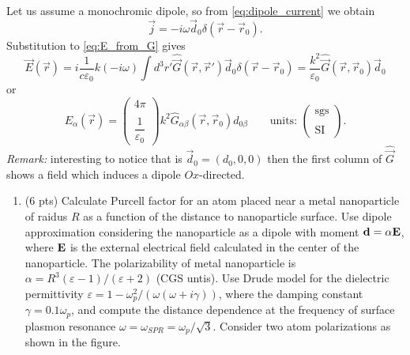\begin{testexample}
	Let us assume a monochromic dipole, so from \eqref{eq:dipole_current} we obtain
	\begin{equation}
		\vec{j} = -i\omega \vec{d}_0 \delta(\vec{r} - \vec{r}_0).
		\label{eq:dipole_curr}
	\end{equation}
	Substitution to \eqref{eq:E_from_G} gives
	\begin{equation}
		\vec{E}(\vec{r}) = i \frac{1}{c \varepsilon_0}k (-i\omega) \int d^3 r' \hat{\vec{G}}(\vec{r}, \vec{r}') \vec{d}_0 \delta(\vec{r} - \vec{r}_0) = \frac{k^2}{\varepsilon_0} \hat{\vec{G}}(\vec{r}, \vec{r}_0) \vec{d}_0
		\label{eq:dipole_field}
	\end{equation}
	or
	\begin{equation}
		E_{\alpha}(\vec{r}) = \begin{pmatrix}
		4\pi  \\ \\
		\dfrac{1}{\varepsilon_0}
		\end{pmatrix} k^2  \hat{G}_{\alpha \beta}(\vec{r}, \vec{r}_0) d_{0 \beta} \qquad \text{units: }\begin{pmatrix}
		\text{sgs}  \\ \\
		\text{SI}
		\end{pmatrix}.
	\end{equation}
	\textit{Remark:} interesting to notice that is $\vec{d}_0 = (d_0,0,0)$ then the first column of $\hat{\vec{G}}$ shows a field which induces a dipole $Ox$-directed.
\end{testexample}


\begin{hw}

\begin{enumerate}

\item (6 pts) Calculate Purcell factor for an atom placed near a metal nanoparticle of raidus $R$ as a function of the distance to nanoparticle surface. Use dipole approximation considering the nanoparticle as a dipole with moment ${\bf d}=\alpha {\bf E}$, where ${\bf E}$  is the external electrical field calculated in the center of the nanoparticle. The polarizability of metal nanoparticle is $\alpha=R^3(\varepsilon-1)/(\varepsilon+2)$ (CGS untis). Use Drude model for the dielectric permittivity $\varepsilon=1-\omega_p^2/(\omega(\omega+i\gamma))$, where the damping constant  $\gamma=0.1\omega_p$, and compute the distance dependence at the frequency of surface plasmon resonance $\omega=\omega_{SPR}=\omega_p/\sqrt{3}$. Consider two atom polarizations as shown in the figure.

\end{enumerate}
\end{hw}

